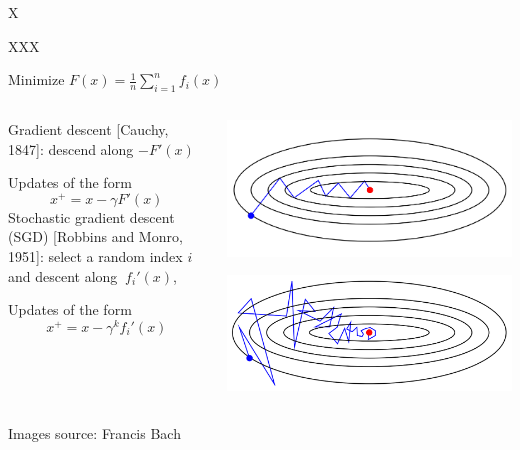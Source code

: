\documentclass[10pt, notes]{beamer}
\begin{document}
\begin{frame}{X}


\end{frame}


\begin{frame}{XXX}
\begin{center}
{ Minimize $F(x) = \frac{1}{n}\sum^{n}_{i=1} f_i(x)$}
\end{center}

\begin{columns}
\begin{column}{0.5\textwidth}  %
Gradient descent [Cauchy, 1847]: descend along $-F'(x)$

Updates of the form $$x^+ = x - \gamma F'(x)$$
Stochastic gradient descent (SGD) [Robbins and Monro, 1951]: select a random index $i$ and descent along $~f_i'(x)$,

Updates of the form $$x^+ = x - \gamma^k f_i'(x)$$

\end{column}
\begin{column}{0.5\textwidth}  %
\includegraphics[width=\linewidth]{img/gd}

\vspace{2em}
\includegraphics[width=\linewidth]{img/sgd}

\end{column}
\end{columns}







Images source: Francis Bach

\end{frame}
\end{document}
